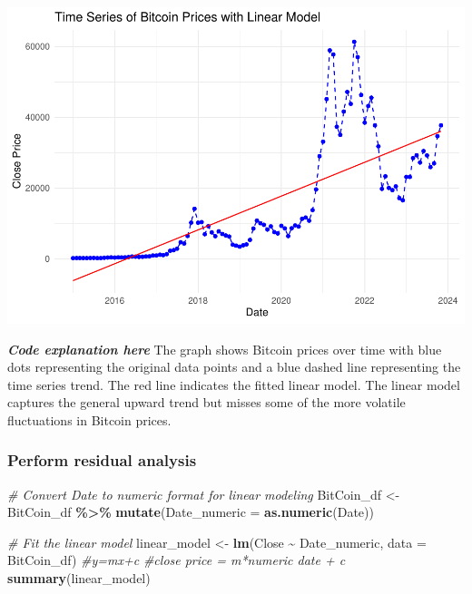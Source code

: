 \documentclass[
]{book}
\newenvironment{Shaded}{\begin{snugshade}}{\end{snugshade}}
\newcommand{\AttributeTok}[1]{\textcolor[rgb]{0.13,0.29,0.53}{#1}}
\newcommand{\CommentTok}[1]{\textcolor[rgb]{0.56,0.35,0.01}{\textit{#1}}}
\newcommand{\FunctionTok}[1]{\textcolor[rgb]{0.13,0.29,0.53}{\textbf{#1}}}
\newcommand{\NormalTok}[1]{#1}
\newcommand{\OtherTok}[1]{\textcolor[rgb]{0.56,0.35,0.01}{#1}}
\newcommand{\SpecialCharTok}[1]{\textcolor[rgb]{0.81,0.36,0.00}{\textbf{#1}}}
\begin{document}
\includegraphics{bookdown-demo_files/figure-latex/unnamed-chunk-18-1.pdf}

\emph{\textbf{Code explanation here}}
The graph shows Bitcoin prices over time with blue dots representing the original data points and a blue dashed line representing the time series trend. The red line indicates the fitted linear model. The linear model captures the general upward trend but misses some of the more volatile fluctuations in Bitcoin prices.

\subsubsection{Perform residual analysis}\label{perform-residual-analysis}

\begin{Shaded}
\begin{Highlighting}[]
\CommentTok{\# Convert Date to numeric format for linear modeling}
\NormalTok{BitCoin\_df }\OtherTok{\textless{}{-}}\NormalTok{ BitCoin\_df }\SpecialCharTok{\%\textgreater{}\%}
\FunctionTok{mutate}\NormalTok{(}\AttributeTok{Date\_numeric =} \FunctionTok{as.numeric}\NormalTok{(Date))}



\CommentTok{\# Fit the linear model}
\NormalTok{linear\_model }\OtherTok{\textless{}{-}} \FunctionTok{lm}\NormalTok{(Close }\SpecialCharTok{\textasciitilde{}}\NormalTok{ Date\_numeric, }\AttributeTok{data =}\NormalTok{ BitCoin\_df)}
\CommentTok{\#y=mx+c}
\CommentTok{\#close price = m*numeric date + c}
\FunctionTok{summary}\NormalTok{(linear\_model)}
\end{Highlighting}
\end{Shaded}
\end{document}

